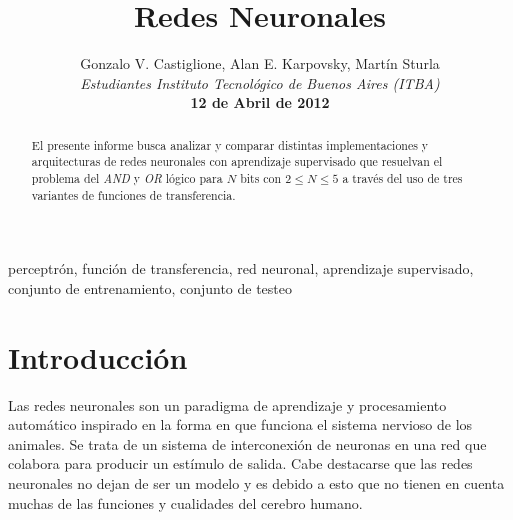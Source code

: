 \documentclass[%
    final,
    reprint,
    notitlepage,
    narroweqnarray,
    inline,
    twoside,
    invited
    ]{ieee}
\begin{document}
\title[Redes Neuronales]{%
       Redes Neuronales}

\author[Castiglione, Karpovsky, Sturla]{Gonzalo V. Castiglione, Alan E. Karpovsky, Martín Sturla\\\textit{Estudiantes 
       Instituto Tecnológico de Buenos Aires (ITBA)}\\
\textbf{12 de Abril de 2012}
}



\lognumber{}
\pubitemident{}


\maketitle               

\begin{abstract} 
El presente informe busca analizar y comparar distintas implementaciones y arquitecturas de redes neuronales con aprendizaje supervisado que resuelvan el problema del \textit{AND} y \textit{OR} lógico para $N$ bits con $2 \le N \le 5$ a través del uso de tres variantes de funciones de transferencia.

\end{abstract}

\begin{keywords}
perceptrón, función de transferencia, red neuronal, aprendizaje supervisado, conjunto de entrenamiento, conjunto de testeo
\end{keywords}

\section{Introducción}

\PARstart Las redes neuronales son un paradigma de aprendizaje y procesamiento automático inspirado en la forma en que funciona el sistema nervioso de los animales. Se trata de un sistema de interconexión de neuronas en una red que colabora para producir un estímulo de salida. Cabe destacarse que las redes neuronales no dejan de ser un modelo y es debido a esto que no tienen en cuenta muchas de las funciones y cualidades del cerebro humano.
\end{document}
